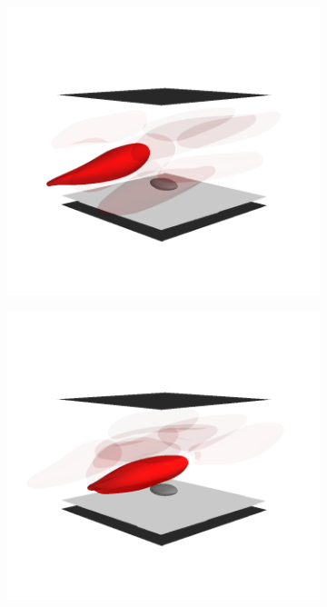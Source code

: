 \begin{figure}[tbp]
    \begin{subfigure}[t]{0.5\textwidth}
        \includegraphics[trim=50 75 50 125, clip, width=\textwidth]{figures/flyover460.png}%
    \end{subfigure}%
    \begin{subfigure}[t]{0.5\textwidth}
        \includegraphics[trim=50 75 50 125, clip, width=\textwidth]{figures/flyover495.png}
    \end{subfigure}


\end{figure}
